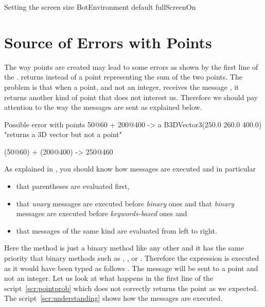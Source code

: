 \begin{scriptwithtitle}{Setting the screen size}\label{scr:screenSize}
BotEnvironment default fullScreenOn
\end{scriptwithtitle}



\section{Source of Errors with Points}

The way points are created may lead to some errors as shown by the first line of the .  returns  instead of a point representing the sum of the two points. The problem is that when a point, and not an integer, receives the message , it returns another kind of point that does not interest us.  Therefore we should pay attention to the way the messages are sent as explained below.

\begin{scriptwithtitle}{Possible error with points}\label{scr:pointprob}
50@60 + 200@400
->  a B3DVector3(250.0 260.0 400.0)
"returns a 3D vector but not a point"

(50@60) + (200@400)
-> 250@460
\end{scriptwithtitle}


As explained in , you should know how messages are executed and in particular
\begin{itemize}
\item that parentheses \ct{()} are evaluated first,  
\item that {\em unary} messages are executed before {\em binary} ones and that \emph{binary} messages are executed before {\em keywords-based} ones and 
\item that  messages of the same kind are evaluated from left to right. 
\end{itemize}

Here the method  is just a binary method like any other and it has the same priority that binary methods such as \ct{+}, \ct{*}, or \ct{//}. Therefore the expression  is executed as it would have been typed as follows . The message  will be sent to a point and not an integer. Let us look at what happens in the first line of the script~\ref{scr:pointprob} which does not correctly returns the point  as we expected. The script~\ref{scr:understanding} shows how the messages are executed. 

